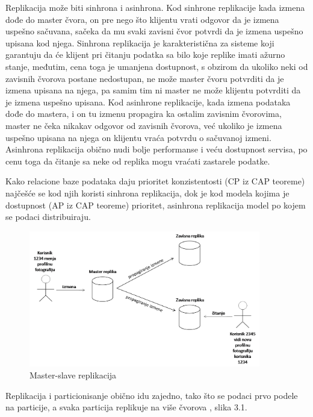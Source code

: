 \documentclass[12pt,oneside]{memoir}
\begin{document}
Replikacija može biti sinhrona i asinhrona. Kod sinhrone replikacije kada izmena dođe do master čvora, on pre nego što klijentu vrati odgovor da je izmena uspešno sačuvana, sačeka da mu svaki zavisni čvor potvrdi da je izmena uspešno upisana kod njega. Sinhrona replikacija je karakteristična za sisteme koji garantuju da će klijent pri čitanju podatka sa bilo koje replike imati ažurno stanje, međutim, cena toga je umanjena dostupnost, s obzirom da ukoliko neki od zavisnih čvorova postane nedostupan, ne može master čvoru potvrditi da je izmena upisana na njega, pa samim tim ni master ne može klijentu potvrditi da je izmena uspešno upisana. Kod asinhrone replikacije, kada izmena podataka dođe do mastera, i on tu izmenu propagira ka ostalim zavisnim čvorovima, master ne čeka nikakav odgovor od zavisnih čvorova, već ukoliko je izmena uspešno upisana na njega on klijentu vraća potvrdu o sačuvanoj izmeni. Asinhrona replikacija obično nudi bolje performanse i veću dostupnost servisa, po cenu toga da čitanje sa neke od replika mogu vraćati zastarele podatke.

Kako relacione baze podataka daju prioritet konzistentosti (CP iz CAP teoreme) najčešće se kod njih koristi sinhrona replikacija, dok je kod modela kojima je dostupnost (AP iz CAP teoreme) prioritet, asinhrona replikacija model po kojem se podaci distribuiraju.



\begin{figure}[!ht]
  \centering
  \includegraphics[width=0.9\textwidth]{master-slave.png}
  \caption{Master-slave replikacija}
  \label{fig:grafikon}
\end{figure}

\pagebreak
Replikacija i particionisanje obično idu zajedno, tako što se podaci prvo podele na particije, a svaka particija replikuje na više čvorova \cite{ColumnarOriented}, slika 3.1. 
\end{document}
